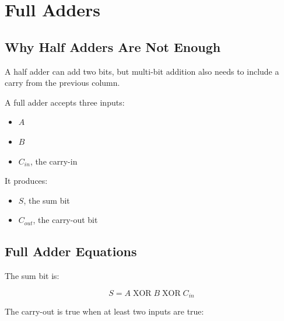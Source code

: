 \chapter{Full Adders}
\label{chap:full-adders}



\section{Why Half Adders Are Not Enough}

A half adder can add two bits, but multi-bit addition also needs to include a carry from the previous column.

A full adder accepts three inputs:

\begin{itemize}
    \item \(A\)
    \item \(B\)
    \item \(C_{in}\), the carry-in
\end{itemize}

It produces:

\begin{itemize}
    \item \(S\), the sum bit
    \item \(C_{out}\), the carry-out bit
\end{itemize}

\section{Full Adder Equations}

The sum bit is:

\[
S=A\operatorname{XOR}B\operatorname{XOR}C_{in}
\]

The carry-out is true when at least two inputs are true:

